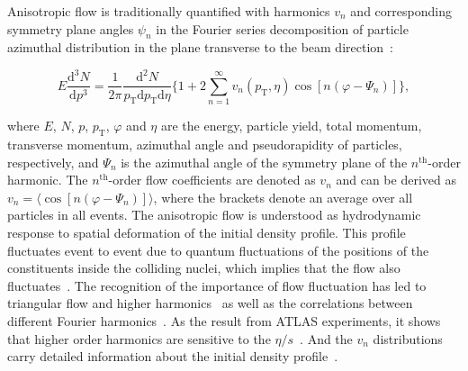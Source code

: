 \documentclass[ALICE,manyauthors]{cernphprep}
\begin{document}
Anisotropic flow is traditionally quantified with harmonics $v_n$ and corresponding symmetry plane angles $\psi_n$ in the Fourier series decomposition of particle azimuthal distribution in the plane transverse to the beam direction~\cite{Voloshin:1994mz}:

\begin{equation}
E\frac{\mathrm{d}^3N}{\mathrm{d}p^3} = \frac{1}{2\pi}\frac{\mathrm{d}^2N}{p_{\mathrm{T}}\mathrm{d}p_{\mathrm{T}}\mathrm{d}\eta} \Big\{1 + 2\sum_{n=1}^{\infty} v_n(p_{\mathrm{T}},\eta) \cos[n(\varphi - \Psi_n)]\Big\},
\label{Eq:Fourier}
\end{equation}

\noindent where $E$, $N$, $p$, $p_{\mathrm{T}}$, $\varphi$ and $\eta$ are the energy, particle yield, total momentum, transverse momentum, azimuthal angle and pseudorapidity of particles, respectively, and $\Psi_n$ is the azimuthal angle of the symmetry plane of the $n^{\mathrm{th}}$-order harmonic. The $n^{\mathrm{th}}$-order flow coefficients are denoted as $v_n$ and can be derived as $v_{n} = \langle{\cos[n(\varphi - \Psi_n)]}\rangle$, where the brackets denote an average over all particles in all events.
The anisotropic flow is understood as hydrodynamic response to spatial deformation of the initial density profile.
This profile fluctuates event to event due to quantum fluctuations of the positions of the constituents inside the colliding nuclei, which implies that the flow also fluctuates~\cite{Miller:2003kd,Alver:2006wh}.
The recognition of the importance of flow fluctuation has led to triangular flow and higher harmonics~\cite{Alver:2010gr,ALICE:2011ab} as well as the correlations between different Fourier harmonics~\cite{Aad:2014fla}.
 As the result from ATLAS experiments, it shows that higher order harmonics are sensitive to the $\eta/s$~\cite{Luzum:2012wu}.
And the $v_{n}$ distributions carry detailed information about the initial density profile~\cite{Renk:2014jja,Yan:2014nsa}.
\end{document}
